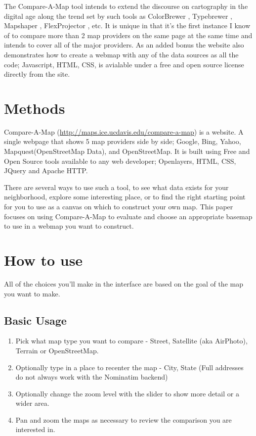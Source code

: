 \documentclass[12pt,letterpaper]{article}
\begin{document}
	  The Compare-A-Map tool intends to extend the discourse on cartography in the digital age along the trend set by such tools as ColorBrewer \parencite{Harrower2003}, Typebrewer \parencite{Sheesley2008}, Mapshaper \parencite{Bloch2006}, FlexProjector \parencite{Jenny2010} , etc. It is unique in that it's the first instance I know of to compare more than 2 map providers on the same page at the same time and intends to cover all of the major providers. As an added bonus the website also demonstrates how to create a webmap with any of the data sources as all the code; Javascript, HTML, CSS, is avialable under a free and open source license directly from the site.
	


\section{Methods}
Compare-A-Map (\url{http://maps.ice.ucdavis.edu/compare-a-map}) is a website. A single webpage that shows 5 map providers side by side;
Google, Bing, Yahoo, Mapquest(OpenStreetMap Data), and OpenStreetMap. It is built using Free and Open Source tools available to any web developer; Openlayers, HTML, CSS, JQuery and Apache HTTP.

There are several ways to use such a tool, to see what data exists for your neighborhood, explore some interesting place, or to find the right starting point for you to use as a canvas on which to construct your own map. This paper focuses on using Compare-A-Map to evaluate and choose an appropriate basemap to use in a webmap you want to construct.

\section{How to use}
All of the choices you'll make in the interface are based on the goal of the map you want to make.

\subsection{Basic Usage}
\begin{enumerate}
\item Pick what map type you want to compare - Street, Satellite (aka AirPhoto), Terrain or OpenStreetMap.
\item Optionally type in a place to recenter the map - City, State (Full addresses do not always work with the Nominatim backend) %
\item Optionally change the zoom level with the slider to show more detail or a wider area.
\item Pan and zoom the maps as necessary to review the comparison you are interested in.
\end{enumerate}
\end{document}
